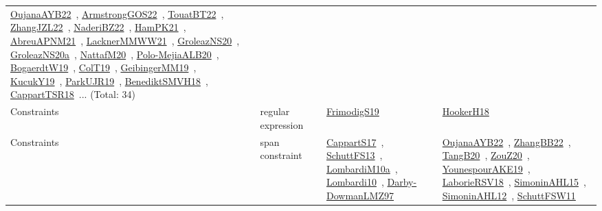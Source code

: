 {\begin{longtable}{lp{3cm}>{\raggedright\arraybackslash}p{6cm}>{\raggedright\arraybackslash}p{6cm}>{\raggedright\arraybackslash}p{8cm}}
\href{works/OujanaAYB22.pdf}{OujanaAYB22}~\cite{OujanaAYB22}, \href{works/ArmstrongGOS22.pdf}{ArmstrongGOS22}~\cite{ArmstrongGOS22}, \href{works/TouatBT22.pdf}{TouatBT22}~\cite{TouatBT22}, \href{works/ZhangJZL22.pdf}{ZhangJZL22}~\cite{ZhangJZL22}, \href{works/NaderiBZ22.pdf}{NaderiBZ22}~\cite{NaderiBZ22}, \href{works/HamPK21.pdf}{HamPK21}~\cite{HamPK21}, \href{works/AbreuAPNM21.pdf}{AbreuAPNM21}~\cite{AbreuAPNM21}, \href{works/LacknerMMWW21.pdf}{LacknerMMWW21}~\cite{LacknerMMWW21}, \href{works/GroleazNS20.pdf}{GroleazNS20}~\cite{GroleazNS20}, \href{works/GroleazNS20a.pdf}{GroleazNS20a}~\cite{GroleazNS20a}, \href{works/NattafM20.pdf}{NattafM20}~\cite{NattafM20}, \href{works/Polo-MejiaALB20.pdf}{Polo-MejiaALB20}~\cite{Polo-MejiaALB20}, \href{works/BogaerdtW19.pdf}{BogaerdtW19}~\cite{BogaerdtW19}, \href{works/ColT19.pdf}{ColT19}~\cite{ColT19}, \href{works/GeibingerMM19.pdf}{GeibingerMM19}~\cite{GeibingerMM19}, \href{works/KucukY19.pdf}{KucukY19}~\cite{KucukY19}, \href{works/ParkUJR19.pdf}{ParkUJR19}~\cite{ParkUJR19}, \href{works/BenediktSMVH18.pdf}{BenediktSMVH18}~\cite{BenediktSMVH18}, \href{works/CappartTSR18.pdf}{CappartTSR18}~\cite{CappartTSR18}... (Total: 34)\\
Constraints & regular expression &  & \href{works/FrimodigS19.pdf}{FrimodigS19}~\cite{FrimodigS19} & \href{works/HookerH18.pdf}{HookerH18}~\cite{HookerH18}\\
Constraints & span constraint &  & \href{works/CappartS17.pdf}{CappartS17}~\cite{CappartS17}, \href{works/SchuttFS13.pdf}{SchuttFS13}~\cite{SchuttFS13}, \href{works/LombardiM10a.pdf}{LombardiM10a}~\cite{LombardiM10a}, \href{works/Lombardi10.pdf}{Lombardi10}~\cite{Lombardi10}, \href{works/Darby-DowmanLMZ97.pdf}{Darby-DowmanLMZ97}~\cite{Darby-DowmanLMZ97} & \href{works/OujanaAYB22.pdf}{OujanaAYB22}~\cite{OujanaAYB22}, \href{works/ZhangBB22.pdf}{ZhangBB22}~\cite{ZhangBB22}, \href{works/TangB20.pdf}{TangB20}~\cite{TangB20}, \href{works/ZouZ20.pdf}{ZouZ20}~\cite{ZouZ20}, \href{works/YounespourAKE19.pdf}{YounespourAKE19}~\cite{YounespourAKE19}, \href{works/LaborieRSV18.pdf}{LaborieRSV18}~\cite{LaborieRSV18}, \href{works/SimoninAHL15.pdf}{SimoninAHL15}~\cite{SimoninAHL15}, \href{works/SimoninAHL12.pdf}{SimoninAHL12}~\cite{SimoninAHL12}, \href{works/SchuttFSW11.pdf}{SchuttFSW11}~\cite{SchuttFSW11}\\

\end{longtable}}
